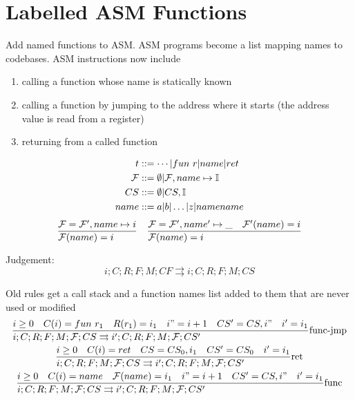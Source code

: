 \documentclass{article}
\newcommand{\execs}[0]{\ensuremath{\rightrightarrows}}
\begin{document}
\newpage
\section{Labelled ASM Functions}
Add named functions to ASM. ASM programs become a list mapping names to codebases. ASM instructions now include
\begin{enumerate}
    \item calling a function whose name is statically known
    \item calling a function by jumping to the address where it starts (the address value is read from a register)
    \item returning from a called function
\end{enumerate}

\begin{align*}
    t &::= \cdots | fun\ r | name | ret \\
    \cF &::= \emptyset | \cF,name\mapsto \I \\
    CS &::= \emptyset | CS,\I \\
    name &::= a|b|\dots|z|namename
\end{align*}
\[\begin{array}{cc}
    \st[]{\cF(name)=i}{\cF=\cF',name\mapsto i} &
    \st[]{\cF(name)=i}{\cF=\cF',name'\mapsto \_\quad \cF'(name)=i} \\
\end{array}\]

Judgement:
\begin{equation*}
    i;C;R;F;M;CF \rightrightarrows i;C;R;F;M;CS
\end{equation*}

Old rules get a call stack and a function names list added to them that are never used or modified
\begin{gather*}
    \st[func-jmp]{i;C;R;F;M;\cF;CS \execs i';C;R;F;M;\cF;CS'}{
        i\geq 0 \quad
        C(i)=fun\ r_1 \quad
        R(r_1)=i_1 \quad
        i"=i+1 \quad
        CS' = CS,i"\quad
        i'=i_1
    } \\
    \st[ret]{i;C;R;F;M;\cF;CS \execs i';C;R;F;M;\cF;CS'}{
        i\geq 0 \quad
        C(i)=ret \quad
        CS = CS_0,i_1 \quad
        CS' = CS_0 \quad
        i'=i_1
    } \\
    \st[func]{i;C;R;F;M;\cF;CS \execs i';C;R;F;M;\cF;CS'}{
        i\geq 0 \quad
        C(i)= name \quad
        \cF(name) = i_1 \quad
        i" = i+1 \quad
        CS' = CS,i" \quad
        i'=i_1
    } \\
\end{gather*}
\end{document}
